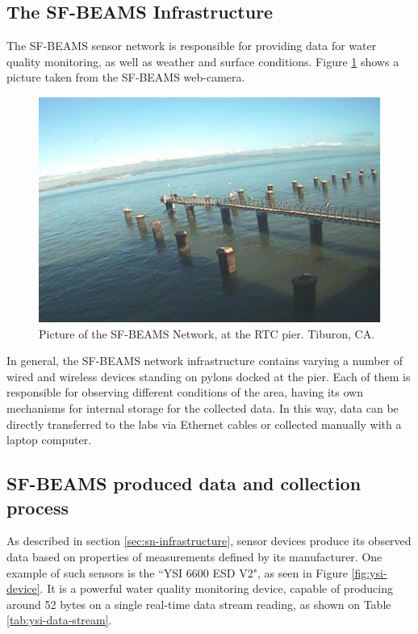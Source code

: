 \subsection{The SF-BEAMS Infrastructure}

The SF-BEAMS sensor network is responsible for providing data for water quality
monitoring, as well as weather and surface conditions. Figure
\ref{fig:sf-beams} shows a picture taken from the SF-BEAMS web-camera.

\begin{figure}[!t]
  \centering
    \includegraphics[scale=0.7]{../diagrams/cam_image-oct15}
  \caption{Picture of the SF-BEAMS Network, at the RTC pier. Tiburon, CA.}
  \label{fig:sf-beams}
\end{figure}

In general, the SF-BEAMS network infrastructure contains varying a number of
wired and wireless devices standing on pylons docked at the pier. Each of them
is responsible for observing different conditions of the area, having its own
mechanisms for internal storage for the collected data. In this way, data can
be directly transferred to the labs via Ethernet cables or collected manually
with a laptop computer.

\subsection{SF-BEAMS produced data and collection process}
\label{sec:sfbeams}

As described in section \ref{sec:sn-infrastructure}, sensor devices produce
its observed data based on properties of measurements defined by its
manufacturer. One example of such sensors is the ``YSI 6600 ESD V2", as seen in
Figure \ref{fig:ysi-device}. It is a powerful water quality monitoring device,
capable of producing around 52 bytes on a single real-time data stream reading,
as shown on Table \ref{tab:ysi-data-stream}.

